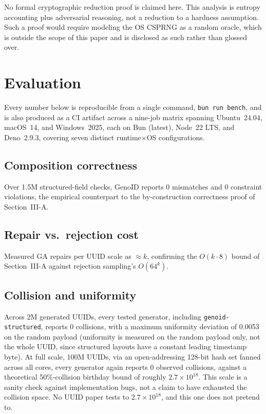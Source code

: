\documentclass[conference]{IEEEtran}
\begin{document}
\indent No formal cryptographic reduction proof is claimed here. This analysis is entropy accounting plus adversarial reasoning, not a reduction to a hardness assumption. Such a proof would require modeling the OS CSPRNG as a random oracle, which is outside the scope of this paper and is disclosed as such rather than glossed over.
\section{Evaluation}
Every number below is reproducible from a single command, \texttt{bun run bench}, and is also produced as a CI artifact across a nine-job matrix spanning Ubuntu~24.04, macOS~14, and Windows~2025, each on Bun (latest), Node~22 LTS, and Deno~2.9.3, covering seven distinct runtime$\times$OS configurations.

\subsection{Composition correctness}
Over 1.5M structured-field checks, GenoID reports 0 mismatches and 0 constraint violations, the empirical counterpart to the by-construction correctness proof of Section~III-A.

\subsection{Repair vs.\ rejection cost}
Measured GA repairs per UUID scale as $\approx k$, confirming the $O(k\cdot8)$ bound of Section~III-A against rejection sampling's $O(64^k)$.

\subsection{Collision and uniformity}
Across 2M generated UUIDs, every tested generator, including \texttt{genoid-structured}, reports 0 collisions, with a maximum uniformity deviation of 0.0053 on the random payload (uniformity is measured on the random payload only, not the whole UUID, since structured layouts have a constant leading timestamp byte). At full scale, 100M UUIDs, via an open-addressing 128-bit hash set fanned across all cores, every generator again reports 0 observed collisions, against a theoretical 50\%-collision birthday bound of roughly $2.7\times10^{18}$. This scale is a sanity check against implementation bugs, not a claim to have exhausted the collision space. No UUID paper tests to $2.7\times10^{18}$, and this one does not pretend to.
\end{document}
